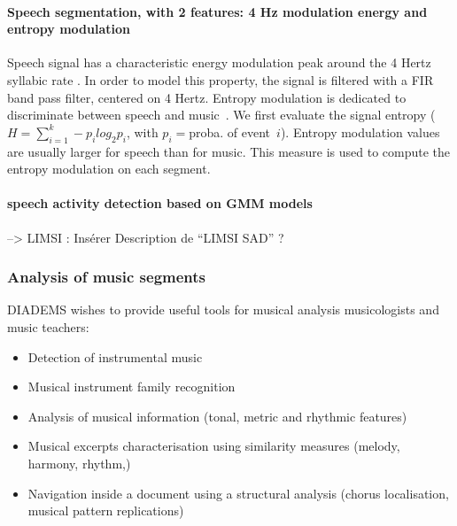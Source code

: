 \documentclass{sig-alternate}
\begin{document}
\paragraph{Speech segmentation, with 2 features: 4 Hz modulation energy and entropy modulation} 
Speech signal has a characteristic energy modulation peak around the 4 Hertz syllabic rate \cite{Houtgast1985}. In order to model this property, the signal is filtered with a FIR band pass filter, centered on 4 Hertz.
Entropy modulation is dedicated to discriminate between speech and music~\cite{Pinquier2003}. We first evaluate the signal entropy ($H=\sum_{i=1}^{k}-p_ilog_2p_i$, with $p_i=$proba. of event~$i$). Entropy modulation values are usually larger for speech than for music. This measure is used to compute the entropy modulation on each segment. 

\paragraph{speech activity detection based on GMM models}
{\color{red}  --> LIMSI : Insérer Description de ``LIMSI SAD'' ?}


\subsubsection{Analysis of music segments}

DIADEMS wishes to provide useful tools for musical analysis musicologists and music teachers:
\begin{itemize}
\item Detection of instrumental music
\item Musical instrument family recognition
\item Analysis of musical information (tonal, metric and rhythmic
  features)
\item Musical excerpts characterisation using similarity measures
  (melody, harmony, rhythm,)
\item Navigation inside a document using a structural analysis (chorus
  localisation, musical pattern replications)
\end{itemize}
\end{document}
